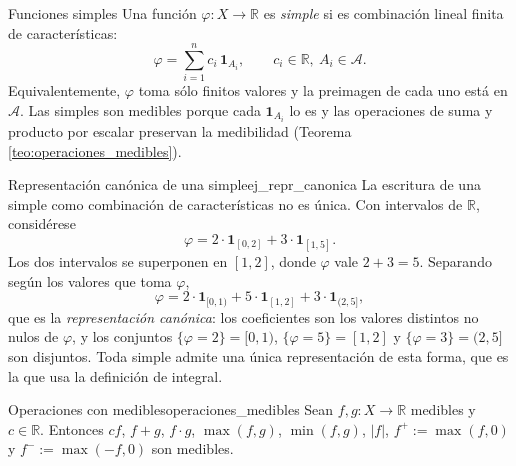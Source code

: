 \documentclass[11pt, a4paper]{article}
\begin{document}
\begin{ejemplo}{Funciones simples}{}
Una función $\varphi: X \to \mathbb{R}$ es \emph{simple} si es combinación lineal finita de
características:
$$ \varphi = \sum_{i=1}^n c_i \, \mathbf{1}_{A_i}, \qquad c_i \in \mathbb{R}, \ A_i \in \mathcal{A}.
$$
Equivalentemente, $\varphi$ toma sólo finitos valores y la preimagen de cada uno está en
$\mathcal{A}$. Las simples son medibles porque cada $\mathbf{1}_{A_i}$ lo es y las operaciones de
suma y producto por escalar preservan la medibilidad (Teorema \ref{teo:operaciones_medibles}).
\end{ejemplo}

\begin{ejemplo}{Representación canónica de una simple}{ej_repr_canonica}
La escritura de una simple como combinación de características no es única. Con intervalos de
$\mathbb{R}$, considérese
$$ \varphi = 2 \cdot \mathbf{1}_{[0,2]} + 3 \cdot \mathbf{1}_{[1,5]}. $$
Los dos intervalos se superponen en $[1,2]$, donde $\varphi$ vale $2 + 3 = 5$. Separando según
los valores que toma $\varphi$,
$$ \varphi = 2 \cdot \mathbf{1}_{[0,1)} + 5 \cdot \mathbf{1}_{[1,2]} + 3 \cdot \mathbf{1}_{(2,5]},
$$
que es la \emph{representación canónica}: los coeficientes son los valores distintos no nulos
de $\varphi$, y los conjuntos $\{\varphi = 2\} = [0,1)$, $\{\varphi = 5\} = [1,2]$ y
$\{\varphi = 3\} = (2,5]$ son disjuntos. Toda simple admite una única representación de esta
forma, que es la que usa la definición de integral.
\end{ejemplo}

\begin{teorema}{Operaciones con medibles}{operaciones_medibles}
Sean $f, g: X \to \mathbb{R}$ medibles y $c \in \mathbb{R}$. Entonces $cf$, $f + g$, $f \cdot g$,
$\max(f, g)$, $\min(f, g)$, $|f|$, $f^+ := \max(f, 0)$ y $f^- := \max(-f, 0)$ son medibles.
\end{teorema}
\end{document}
